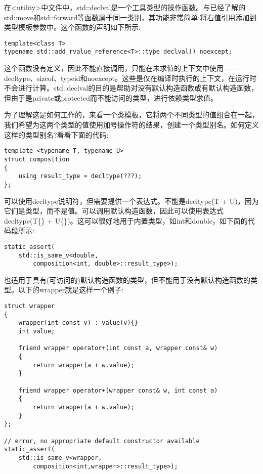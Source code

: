在<utility>中文件中，std::declval是一个工具类型的操作函数。与已经了解的std::move和std::forward等函数属于同一类别，其功能非常简单:将右值引用添加到类型模板参数中。这个函数的声明如下所示:

\begin{lstlisting}[style=styleCXX]
template<class T>
typename std::add_rvalue_reference<T>::type declval() noexcept;
\end{lstlisting}

这个函数没有定义，因此不能直接调用，只能在未求值的上下文中使用——decltype、sizeof、typeid和noexcept。这些是仅在编译时执行的上下文，在运行时不会进行计算。std::declval的目的是帮助对没有默认构造函数或有默认构造函数，但由于是private或protected而不能访问的类型，进行依赖类型求值。

为了理解这是如何工作的，来看一个类模板，它将两个不同类型的值组合在一起，我们希望为这两个类型的值使用加号操作符的结果，创建一个类型别名。如何定义这样的类型别名?看看下面的代码:

\begin{lstlisting}[style=styleCXX]
template <typename T, typename U>
struct composition
{
	using result_type = decltype(???);
};
\end{lstlisting}

可以使用decltype说明符，但需要提供一个表达式。不能是decltype(T + U)，因为它们是类型，而不是值。可以调用默认构造函数，因此可以使用表达式decltype(T\{\} + U\{\})。这可以很好地用于内置类型，如int和double，如下面的代码段所示:

\begin{lstlisting}[style=styleCXX]
static_assert(
	std::is_same_v<double,
		composition<int, double>::result_type>);
\end{lstlisting}

也适用于具有(可访问的)默认构造函数的类型，但不能用于没有默认构造函数的类型。以下的wrapper就是这样一个例子:

\begin{lstlisting}[style=styleCXX]
struct wrapper
{
	wrapper(int const v) : value(v){}
	int value;
	
	friend wrapper operator+(int const a, wrapper const& w)
	{
		return wrapper(a + w.value);
	}

	friend wrapper operator+(wrapper const& w, int const a)
	{
		return wrapper(a + w.value);
	}
};

// error, no appropriate default constructor available
static_assert(
	std::is_same_v<wrapper,
		composition<int,wrapper>::result_type>);
\end{lstlisting}

